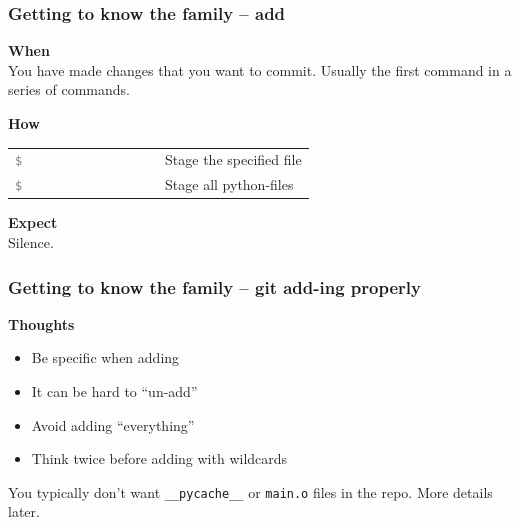 \documentclass{beamer}
\newcommand{\keyword}[1]{\hspace{-1.0em}\textcolor{lkblue}{\textbf{#1}}\vspace{0.2em}} %
\newcommand{\command}[1]{\colorbox{black!78}{\vphantom{Ep}\texttt{\textcolor{gray}{\$}
\textcolor{white}{#1}}}}
\begin{document}
\begin{frame}
  \frametitle{Getting to know the family -- add}
  \keyword{When}\\
    You have made changes that you want to commit.
    Usually the first command in a series of commands.
  \vspace{0.5em}

  \keyword{How}\\
  \hspace{-0.95em}
  \begin{tabular}{ll}
    \command{git add hello.txt} & Stage the specified file \\
    \command{git add *.py} & Stage all python-files \\
  \end{tabular}
  \vspace{0.5em}

  \keyword{Expect}\\
  Silence.
\end{frame}

\begin{frame}
  \frametitle{Getting to know the family -- git add-ing properly}

  \keyword{Thoughts}
  \begin{itemize}[<+->]
    \item Be specific when adding
    \item It can be hard to ``un-add''
    \item Avoid adding ``everything''
    \item Think twice before adding with wildcards
  \end{itemize}

  \vspace{1em}

  You typically don't want \texttt{\_\_pycache\_\_} or \texttt{main.o} files in
  the repo. More details later.

\end{frame}
\end{document}
